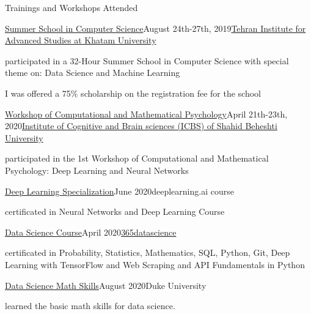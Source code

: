 \documentclass{resume} %
\begin{document}
	\begin{rSection}{Trainings and Workshops Attended}
		\begin{rSubsection}{\href{https://github.com/mina-parham/mina-parham.github.io/raw/master/images/portfolio/shutterbug.jpg}{\textcolor{coolblack}{Summer School in Computer Science}}}{August 24th-27th, 2019}{\href{https://teias.institute/data-science-and-machine-learning/}{\textcolor{coolblack}{Tehran Institute for Advanced Studies at Khatam University}}}{ }
			\item 	participated in a 32-Hour Summer School in Computer Science with special theme on: Data Science and Machine Learning
			\item I was offered a 75\%  scholarship on the registration fee for the school 
		\end{rSubsection}
		\begin{rSubsection}{\href{https://github.com/mina-parham/mina-parham.github.io/raw/master/images/portfolio/beetle.jpg}{\textcolor{coolblack}{Workshop of Computational and Mathematical Psychology}}}{April 21th-23th, 2020}{\href{https://loopacademy.ir/courses/dl/}{\textcolor{coolblack}{Institute of Cognitive and Brain sciences (ICBS) of Shahid Beheshti University}}}{ }
			\item 	participated in the 1st Workshop of Computational and Mathematical Psychology: Deep Learning and Neural Networks
		\end{rSubsection}
			\begin{rSubsection}{\href{https://coursera.org/share/06d373a3ea1ccfb8bcc7327458be324a}{\textcolor{coolblack}{Deep Learning Specialization}}}{June 2020}{deeplearning.ai course}{ }
			\item 	certificated in Neural Networks and Deep Learning Course
		\end{rSubsection}
        	\begin{rSubsection}{\href{https://github.com/mina-parham/365datascience}{\textcolor{coolblack}{Data Science Course}}}{April 2020}{\href{https://365datascience.com/}{\textcolor{coolblack}{365datascience}}}{ }
			\item 	certificated in Probability, Statistics, Mathematics, SQL, Python, Git, Deep Learning with TensorFlow and Web Scraping and API Fundamentals in Python
		\end{rSubsection}
			\begin{rSubsection}{\href{https://coursera.org/share/52b13168dc14aac4678e8cc906144edd}{\textcolor{coolblack}{Data Science Math Skills}}}{August 2020}{Duke University}{ }
			\item 	learned the basic math skills for data science.
		\end{rSubsection}
	\end{rSection}
	
\end{document}
